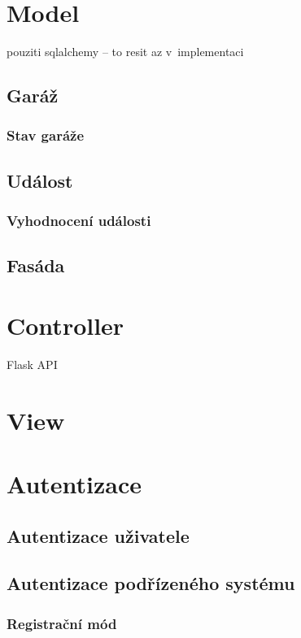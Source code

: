 \section{Model}

pouziti sqlalchemy -- to resit az v~implementaci

\subsection{Garáž}

\subsubsection{Stav garáže}

\subsection{Událost}

\subsubsection{Vyhodnocení události}

\subsection{Fasáda}

\section{Controller}

Flask API

\section{View}

\section{Autentizace}

\subsection{Autentizace uživatele}

\subsection{Autentizace podřízeného systému}

\subsubsection{Registrační mód}

